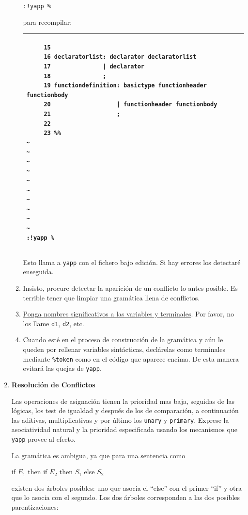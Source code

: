\begin{enumerate}
\begin{enumerate}
\verb|:!yapp %| 

para recompilar:

\vspace{0.5cm}
\begin{tabular}{|p{14.5cm}|}
\hline
\begin{verbatim}
     15
     16 declaratorlist: declarator declaratorlist
     17               | declarator
     18               ;
     19 functiondefinition: basictype functionheader functionbody
     20                   | functionheader functionbody
     21                   ;
     22
     23 %%
~
~
~
~
~
~
~
~
~
~
:!yapp %
\end{verbatim}\\
\hline
\end{tabular}
\vspace{0.5cm}

Esto llama a \verb|yapp| con el fichero bajo edición. Si hay errores los detectaré
enseguida.
\item
Insisto, procure detectar la aparición de un conflicto lo antes posible. Es terrible
tener que limpiar una gramática llena de conflictos.
\item
\underline{Ponga nombres significativos a las variables y terminales}. Por favor,
no los llame \verb|d1|, \verb|d2|, etc.
\item
Cuando esté en el proceso de construcción de la gramática y aún le queden
por rellenar variables sintácticas, declárelas como terminales mediante
\verb|%token| como en el código que aparece encima. De esta manera
evitará las quejas de \verb|yapp|.
\end{enumerate}

\item {\bf Resolución de Conflictos}

Las operaciones de asignación tienen la prioridad mas baja,
seguidas  de las lógicas, los test de igualdad y después 
de los de comparación, a continuación las aditivas, multiplicativas y por 
último los \verb|unary| y \verb|primary|. Exprese la asociatividad natural y la
prioridad especificada usando
los mecanismos que \verb|yapp| provee al efecto.

La gramática es ambigua, ya que para una sentencia como 

\begin{center}
if $E_1$ then if $E_2$ then $S_1$ else $S_2$
\end{center}

existen dos árboles posibles: uno que asocia el ``else'' con el primer ``if'' y otra
que lo asocia con el segundo. Los dos árboles corresponden a las
dos posibles parentizaciones:


\end{enumerate}
